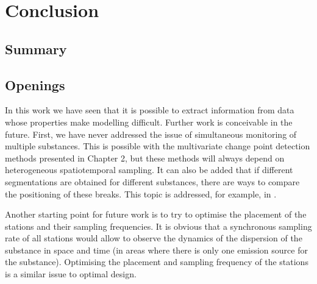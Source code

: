 

\chapter{Conclusion}

\section{Summary}


\section{Openings}

In this work we have seen that it is possible to extract information from data whose properties make modelling difficult. Further work is conceivable in the future. First, we have never addressed the issue of simultaneous monitoring of multiple substances. This is possible with the multivariate change point detection methods presented in Chapter 2, but these methods will always depend on heterogeneous spatiotemporal sampling. It can also be added that if different segmentations are obtained for different substances, there are ways to compare the positioning of these breaks. This topic is addressed, for example, in \cite{Cleynen}. 

Another starting point for future work is to try to optimise the placement of the stations and their sampling frequencies. It is obvious that a synchronous sampling rate of all stations would allow to observe the dynamics of the dispersion of the substance in space and time (in areas where there is only one emission source for the substance). Optimising the placement and sampling frequency of the stations is a similar issue to optimal design.